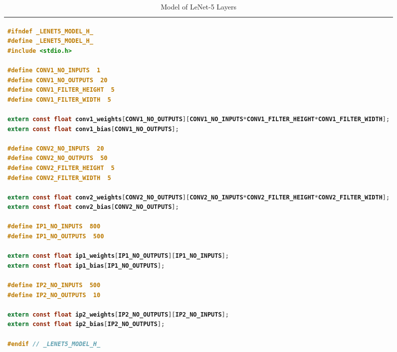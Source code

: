 \lstset{framesep=-5pt, xleftmargin=-5pt}

\begin{table}[!h]
\centering
\caption{Model of LeNet-5 Layers }
\label{cnncode1:lenet5}
\begin{tabular}{l}
\toprule
\begin{lstlisting}[columns=fullflexible, language=C]
#ifndef _LENET5_MODEL_H_
#define _LENET5_MODEL_H_
#include <stdio.h>

#define CONV1_NO_INPUTS  1
#define CONV1_NO_OUTPUTS  20
#define CONV1_FILTER_HEIGHT  5
#define CONV1_FILTER_WIDTH  5

extern const float conv1_weights[CONV1_NO_OUTPUTS][CONV1_NO_INPUTS*CONV1_FILTER_HEIGHT*CONV1_FILTER_WIDTH];
extern const float conv1_bias[CONV1_NO_OUTPUTS];

#define CONV2_NO_INPUTS  20
#define CONV2_NO_OUTPUTS  50
#define CONV2_FILTER_HEIGHT  5
#define CONV2_FILTER_WIDTH  5

extern const float conv2_weights[CONV2_NO_OUTPUTS][CONV2_NO_INPUTS*CONV2_FILTER_HEIGHT*CONV2_FILTER_WIDTH];
extern const float conv2_bias[CONV2_NO_OUTPUTS];

#define IP1_NO_INPUTS  800
#define IP1_NO_OUTPUTS  500

extern const float ip1_weights[IP1_NO_OUTPUTS][IP1_NO_INPUTS];
extern const float ip1_bias[IP1_NO_OUTPUTS];

#define IP2_NO_INPUTS  500
#define IP2_NO_OUTPUTS  10

extern const float ip2_weights[IP2_NO_OUTPUTS][IP2_NO_INPUTS];
extern const float ip2_bias[IP2_NO_OUTPUTS];

#endif // _LENET5_MODEL_H_
\end{lstlisting}
\\
\bottomrule
\end{tabular}
\end{table}
